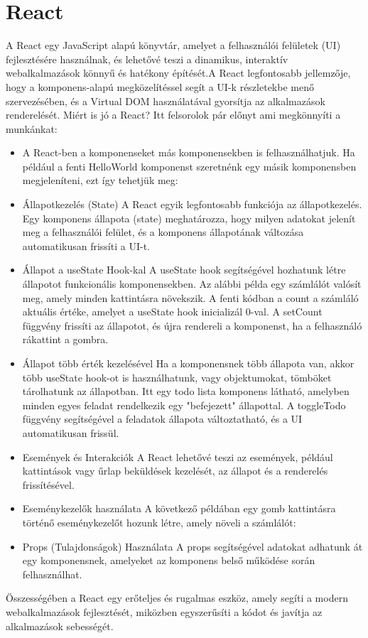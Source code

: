 \documentclass[colorlinks]{thesis-kando}
\theoremstyle{definition}
\theoremstyle{remark}
\begin{document}
\section{React}
A React egy JavaScript alapú könyvtár, amelyet a felhasználói felületek (UI) fejlesztésére használnak, és lehetővé teszi a dinamikus, interaktív webalkalmazások könnyű és hatékony építését.A React legfontosabb jellemzője, hogy a komponens-alapú megközelítéssel segít a UI-k részletekbe menő szervezésében, és a Virtual DOM használatával gyorsítja az alkalmazások renderelését.
Miért is jó a React? Itt felsorolok pár előnyt ami megkönnyíti a munkánkat:
\begin{itemize}
	\item A React-ben a komponenseket más komponensekben is felhasználhatjuk. Ha például a fenti HelloWorld komponenst szeretnénk egy másik komponensben megjeleníteni, ezt így tehetjük meg:

	
	\item Állapotkezelés (State)
	A React egyik legfontosabb funkciója az állapotkezelés. Egy komponens állapota (state) meghatározza, hogy milyen adatokat jelenít meg a felhasználói felület, és a komponens állapotának változása automatikusan frissíti a UI-t.
	
	\item Állapot a useState Hook-kal
	A useState hook segítségével hozhatunk létre állapotot funkcionális komponensekben. Az alábbi példa egy számlálót valósít meg, amely minden kattintásra növekszik.
	A fenti kódban a count a számláló aktuális értéke, amelyet a useState hook inicializál 0-val. A setCount függvény frissíti az állapotot, és újra rendereli a komponenst, ha a felhasználó rákattint a gombra.
	
	\item Állapot több érték kezelésével
	Ha a komponensnek több állapota van, akkor több useState hook-ot is használhatunk, vagy objektumokat, tömböket tárolhatunk az állapotban.
		Itt egy todo lista komponens látható, amelyben minden egyes feladat rendelkezik egy "befejezett" állapottal. A toggleTodo függvény segítségével a feladatok állapota változtatható, és a UI automatikusan frissül.
	
	\item Események és Interakciók
	A React lehetővé teszi az események, például kattintások vagy űrlap beküldések kezelését, az állapot és a renderelés frissítésével.
	
	\item Eseménykezelők használata
	A következő példában egy gomb kattintásra történő eseménykezelőt hozunk létre, amely növeli a számlálót:
	\item Props (Tulajdonságok) Használata
	A props segítségével adatokat adhatunk át egy komponensnek, amelyeket az komponens belső működése során felhasználhat.
\end{itemize}
Összességében a React egy erőteljes és rugalmas eszköz, amely segíti a modern webalkalmazások fejlesztését, miközben egyszerűsíti a kódot és javítja az alkalmazások sebességét.
\end{document}
